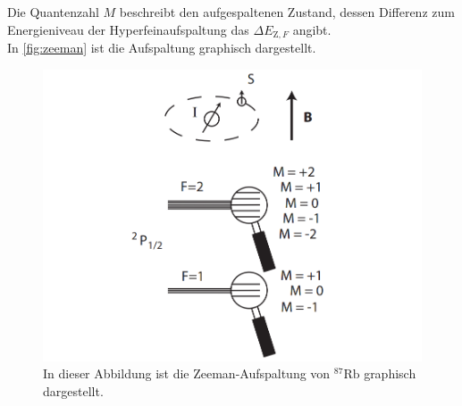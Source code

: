 Die Quantenzahl $M$ beschreibt den aufgespaltenen Zustand, dessen Differenz zum Energieniveau der Hyperfeinaufspaltung das $\Delta E_{\text{Z},F}$ angibt.\\
In \autoref{fig:zeeman} ist die Aufspaltung graphisch dargestellt.

\begin{figure}[H]
    \centering
    \includegraphics[scale=0.4]{figures/zeeman.png}
    \caption{In dieser Abbildung ist die Zeeman-Aufspaltung von $^{87}\text{Rb}$ graphisch dargestellt.\cite{pdf_anleitung}}
    \label{fig:zeeman}
\end{figure}